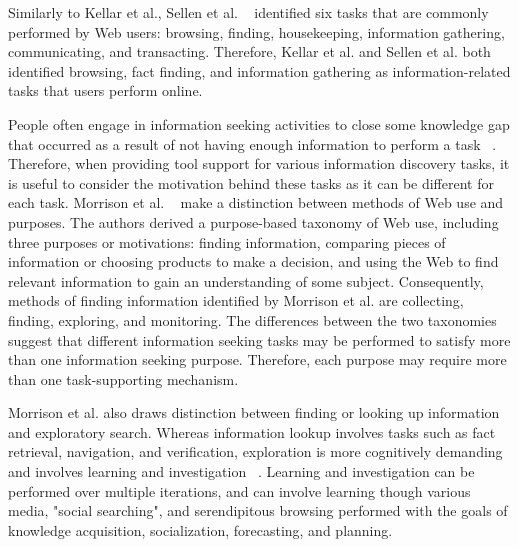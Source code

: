 {{Similarly to Kellar et al., Sellen et al. ~\cite{sellen} identified six tasks that are commonly performed by Web users: browsing, finding, housekeeping, information gathering, communicating, and transacting. Therefore, Kellar et al. and Sellen et al. both identified browsing, fact finding, and information gathering as information-related tasks that users perform online.   

People often engage in information seeking activities to close some knowledge gap that occurred as a result of not having enough information to perform a task ~\cite{proper}. Therefore, when providing tool support for various information discovery tasks, it is useful to consider the motivation behind these tasks as it can be different for each task. Morrison et al. ~\cite{morrison} make a distinction between methods of Web use and purposes. The authors derived a purpose-based taxonomy of Web use, including three purposes or motivations: finding information, comparing pieces of information or choosing products to make a decision, and using the Web to find relevant information to gain an understanding of some subject. Consequently, methods of finding information identified by Morrison et al. are collecting, finding, exploring, and monitoring. The differences between the two taxonomies suggest that different information seeking tasks may be performed to satisfy more than one information seeking purpose. Therefore, each purpose may require more than one task-supporting mechanism. 

Morrison et al. also draws distinction between finding or looking up information and exploratory search. Whereas information lookup involves tasks such as fact retrieval, navigation, and verification, exploration is more cognitively demanding and involves learning and investigation ~\cite{marchionini}. Learning and investigation can be performed over multiple iterations, and can involve learning though various media, "social searching", and serendipitous browsing performed with the goals of knowledge acquisition, socialization, forecasting, and planning.  

}}
